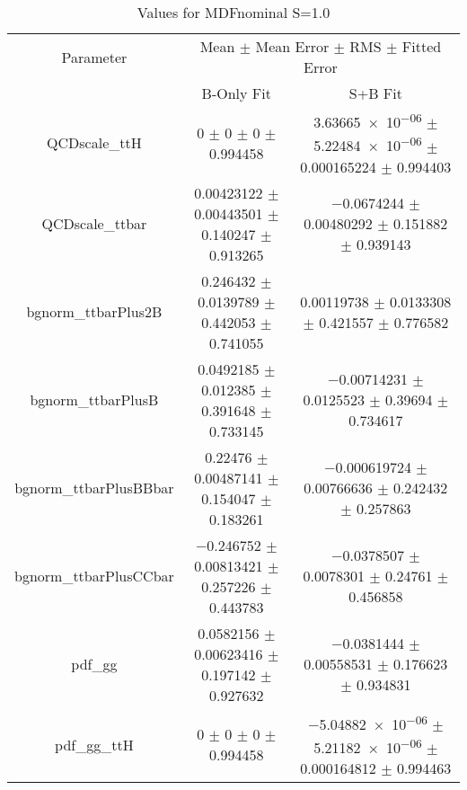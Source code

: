\begin{table}
\centering
\caption{Values for MDFnominal S=1.0}
\begin{tabular}{ccc}
\toprule
Parameter & \multicolumn{2}{c}{Mean $\pm$ Mean Error $\pm$ RMS $\pm$ Fitted Error}\\
 & B-Only Fit & S+B Fit\\
\midrule
QCDscale\_ttH & \num{0} $\pm$ \num{0} $\pm$ \num{0} $\pm$ \num{0.994458} & \num{3.63665e-06} $\pm$ \num{5.22484e-06} $\pm$ \num{0.000165224} $\pm$ \num{0.994403}\\
QCDscale\_ttbar & \num{0.00423122} $\pm$ \num{0.00443501} $\pm$ \num{0.140247} $\pm$ \num{0.913265} & \num{-0.0674244} $\pm$ \num{0.00480292} $\pm$ \num{0.151882} $\pm$ \num{0.939143}\\
bgnorm\_ttbarPlus2B & \num{0.246432} $\pm$ \num{0.0139789} $\pm$ \num{0.442053} $\pm$ \num{0.741055} & \num{0.00119738} $\pm$ \num{0.0133308} $\pm$ \num{0.421557} $\pm$ \num{0.776582}\\
bgnorm\_ttbarPlusB & \num{0.0492185} $\pm$ \num{0.012385} $\pm$ \num{0.391648} $\pm$ \num{0.733145} & \num{-0.00714231} $\pm$ \num{0.0125523} $\pm$ \num{0.39694} $\pm$ \num{0.734617}\\
bgnorm\_ttbarPlusBBbar & \num{0.22476} $\pm$ \num{0.00487141} $\pm$ \num{0.154047} $\pm$ \num{0.183261} & \num{-0.000619724} $\pm$ \num{0.00766636} $\pm$ \num{0.242432} $\pm$ \num{0.257863}\\
bgnorm\_ttbarPlusCCbar & \num{-0.246752} $\pm$ \num{0.00813421} $\pm$ \num{0.257226} $\pm$ \num{0.443783} & \num{-0.0378507} $\pm$ \num{0.0078301} $\pm$ \num{0.24761} $\pm$ \num{0.456858}\\
pdf\_gg & \num{0.0582156} $\pm$ \num{0.00623416} $\pm$ \num{0.197142} $\pm$ \num{0.927632} & \num{-0.0381444} $\pm$ \num{0.00558531} $\pm$ \num{0.176623} $\pm$ \num{0.934831}\\
pdf\_gg\_ttH & \num{0} $\pm$ \num{0} $\pm$ \num{0} $\pm$ \num{0.994458} & \num{-5.04882e-06} $\pm$ \num{5.21182e-06} $\pm$ \num{0.000164812} $\pm$ \num{0.994463}\\
\bottomrule
\end{tabular}
\end{table}